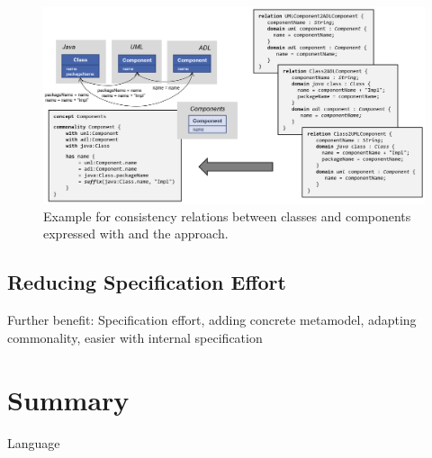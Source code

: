 \begin{figure}
    \centering
    \includegraphics[width=\textwidth]{figures/quality/language/benefit_comprehensibility.png}
    \caption[Benefit of \commonalities regarding comprehensibility]{Example for consistency relations between classes and components expressed with \qvtr and the \commonalities approach.}
    \label{fig:language:benefit_comprehensibility}
\end{figure}

\subsection{Reducing Specification Effort}

Further benefit: Specification effort, adding concrete metamodel, adapting commonality, easier with internal specification


\section{Summary}

\begin{insight}{Language}

\end{insight}



